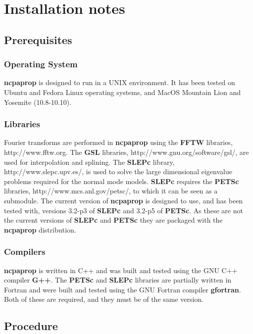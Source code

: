 \section{Installation notes}

\subsection{Prerequisites}

\subsubsection{Operating System}

\textbf{ncpaprop} is designed to run in a UNIX environment. It has been tested on Ubuntu and Fedora Linux operating systems, and MacOS Mountain Lion and Yosemite (10.8-10.10). 

\subsubsection{Libraries}

Fourier transforms are performed in \textbf{ncpaprop} using the \textbf{FFTW} libraries, http://www.fftw.org. The \textbf{GSL} libraries, http://www.gnu.org/software/gsl/, are used for interpolation and splining. The \textbf{SLEPc} library, http://www.slepc.upv.es/, is used to solve the large dimensional eigenvalue problems required for the normal mode models. \textbf{SLEPc} requires the \textbf{PETSc} libraries, http://www.mcs.anl.gov/petsc/, to which it can be seen as a submodule. The current version of \textbf{ncpaprop} is designed to use, and has been tested with, versions 3.2-p3 of \textbf{SLEPc} and 3.2-p5 of \textbf{PETSc}. As these are not the current versions of \textbf{SLEPc} and \textbf{PETSc} they are packaged with the \textbf{ncpaprop} distribution. 

\subsubsection{Compilers}

\textbf{ncpaprop} is written in C++ and was built and tested using the GNU C++ compiler \textbf{G++}.  The \textbf{PETSc} and \textbf{SLEPc} libraries are partially written in Fortran and were built and tested using the GNU Fortran compiler \textbf{gfortran}.  Both of these are required, and they must be of the same version.  

\subsection{Procedure}

